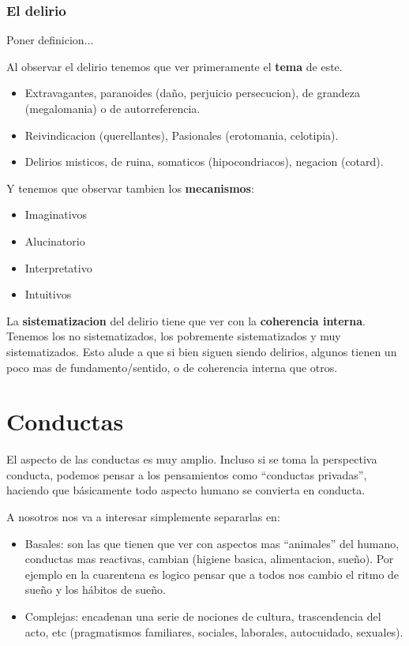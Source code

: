 \documentclass[12pt,a4paper]{article}
\begin{document}
\subsubsection{El delirio}%
\label{ssub:el_delirio}

Poner definicion...

Al observar el delirio tenemos que ver primeramente el \textbf{tema} de este.

\begin{itemize}
	\item Extravagantes, paranoides (daño, perjuicio persecucion), de grandeza (megalomania) o de autorreferencia.
	\item Reivindicacion (querellantes), Pasionales (erotomania, celotipia).
	\item Delirios misticos, de ruina, somaticos (hipocondriacos), negacion (cotard). 
\end{itemize}

Y tenemos que observar tambien los \textbf{mecanismos}:

\begin{itemize}
	\item Imaginativos
	\item Alucinatorio
	\item Interpretativo
	\item Intuitivos
\end{itemize}

La \textbf{sistematizacion} del delirio tiene que ver con la \textbf{coherencia interna}. Tenemos los no sistematizados, los pobremente sistematizados y muy sistematizados. Esto alude a que si bien siguen siendo delirios, algunos tienen un poco mas de fundamento/sentido, o de coherencia interna que otros. 


\section{Conductas}

El aspecto de las conductas es muy amplio. Incluso si se toma la perspectiva conducta, podemos pensar a los pensamientos como \enquote{conductas privadas}, haciendo que básicamente todo aspecto humano se convierta en conducta. 

A nosotros nos va a interesar simplemente separarlas en:

\begin{itemize}
    \item Basales: son las que tienen que ver con aspectos mas \enquote{animales} del humano, conductas mas reactivas, cambian (higiene basica, alimentacion, sueño). Por ejemplo en la cuarentena es logico pensar que a todos nos cambio el ritmo de sueño y los hábitos de sueño.
    \item Complejas: encadenan una serie de nociones de cultura, trascendencia del acto, etc (pragmatismos familiares, sociales, laborales, autocuidado, sexuales).
\end{itemize}
\end{document}
